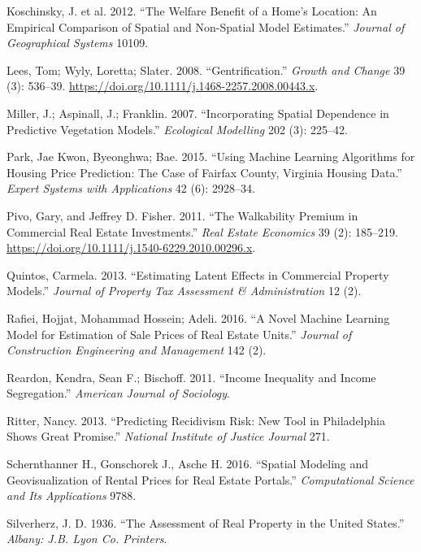 \documentclass[12pt,]{article}
\begin{document}
\leavevmode\hypertarget{ref-Koschinsky2012}{}%
Koschinsky, J. et al. 2012. ``The Welfare Benefit of a Home's Location:
An Empirical Comparison of Spatial and Non-Spatial Model Estimates.''
\emph{Journal of Geographical Systems} 10109.

\leavevmode\hypertarget{ref-Lees2008}{}%
Lees, Tom; Wyly, Loretta; Slater. 2008. ``Gentrification.'' \emph{Growth
and Change} 39 (3): 536--39.
\url{https://doi.org/10.1111/j.1468-2257.2008.00443.x}.

\leavevmode\hypertarget{ref-Miller2015}{}%
Miller, J.; Aspinall, J.; Franklin. 2007. ``Incorporating Spatial
Dependence in Predictive Vegetation Models.'' \emph{Ecological
Modelling} 202 (3): 225--42.

\leavevmode\hypertarget{ref-Park2015}{}%
Park, Jae Kwon, Byeonghwa; Bae. 2015. ``Using Machine Learning
Algorithms for Housing Price Prediction: The Case of Fairfax County,
Virginia Housing Data.'' \emph{Expert Systems with Applications} 42 (6):
2928--34.

\leavevmode\hypertarget{ref-Pivo2011}{}%
Pivo, Gary, and Jeffrey D. Fisher. 2011. ``The Walkability Premium in
Commercial Real Estate Investments.'' \emph{Real Estate Economics} 39
(2): 185--219. \url{https://doi.org/10.1111/j.1540-6229.2010.00296.x}.

\leavevmode\hypertarget{ref-Quintos2013}{}%
Quintos, Carmela. 2013. ``Estimating Latent Effects in Commercial
Property Models.'' \emph{Journal of Property Tax Assessment \&
Administration} 12 (2).

\leavevmode\hypertarget{ref-Rafiei2016}{}%
Rafiei, Hojjat, Mohammad Hossein; Adeli. 2016. ``A Novel Machine
Learning Model for Estimation of Sale Prices of Real Estate Units.''
\emph{Journal of Construction Engineering and Management} 142 (2).

\leavevmode\hypertarget{ref-Reardon2011}{}%
Reardon, Kendra, Sean F.; Bischoff. 2011. ``Income Inequality and Income
Segregation.'' \emph{American Journal of Sociology}.

\leavevmode\hypertarget{ref-Ritter2013}{}%
Ritter, Nancy. 2013. ``Predicting Recidivism Risk: New Tool in
Philadelphia Shows Great Promise.'' \emph{National Institute of Justice
Journal} 271.

\leavevmode\hypertarget{ref-Schernthanner2016}{}%
Schernthanner H., Gonschorek J., Asche H. 2016. ``Spatial Modeling and
Geovisualization of Rental Prices for Real Estate Portals.''
\emph{Computational Science and Its Applications} 9788.

\leavevmode\hypertarget{ref-Silverherz1936}{}%
Silverherz, J. D. 1936. ``The Assessment of Real Property in the United
States.'' \emph{Albany: J.B. Lyon Co. Printers}.
\end{document}
